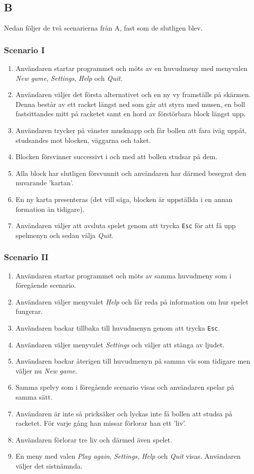 \documentclass[11pt,a4paper]{article}
\begin{document}
\subsection{B}
Nedan följer de två scenarierna från A, fast som de slutligen blev.

\subsubsection{Scenario I}
\begin{enumerate}
	\item Användaren startar programmet och möts av en huvudmeny med menyvalen \emph{New game}, \emph{Settings}, \emph{Help} och \emph{Quit}.
	\item Användaren väljer det första alternativet och en ny vy framställs på skärmen. Denna består av ett racket längst ned som går att styra med musen, en boll fastsittandes mitt på racketet samt en hord av förstörbara block längst upp.
	\item Användaren trycker på vänster musknapp och får bollen att fara iväg uppåt, studsandes mot blocken, väggarna och taket.
	\item Blocken försvinner successivt i och med att bollen studsar på dem.
	\item Alla block har slutligen försvunnit och användaren har därmed besegrat den nuvarande 'kartan'.
	\item En ny karta presenteras (det vill säga, blocken är uppställda i en annan formation än tidigare).
	\item Användaren väljer att avsluta spelet genom att trycka \texttt{Esc} för att få upp spelmenyn och sedan välja \emph{Quit}.
\end{enumerate}

\subsubsection{Scenario II}
\begin{enumerate}
	\item Användaren startar programmet och möts av samma huvudmeny som i föregående scenario.
	\item Användaren väljer menyvalet \emph{Help} och får reda på information om hur spelet fungerar.
	\item Användaren backar tillbaka till huvudmenyn genom att trycka \texttt{Esc}.
	\item Användaren väljer menyvalet \emph{Settings} och väljer att stänga av ljudet.
	\item Användaren backar återigen till huvudmenyn på samma vis som tidigare men väljer nu \emph{New game}.
	\item Samma spelvy som i föregående scenario visas och användaren spelar på samma sätt.
	\item Användaren är inte så pricksäker och lyckas inte få bollen att studsa på racketet. För varje gång han missar förlorar han ett 'liv'.
	\item Användaren förlorar tre liv och därmed även spelet.
	\item En meny med valen \emph{Play again}, \emph{Settings}, \emph{Help} och \emph{Quit} visas. Användaren väljer det sistnämnda.
\end{enumerate}
\end{document}
